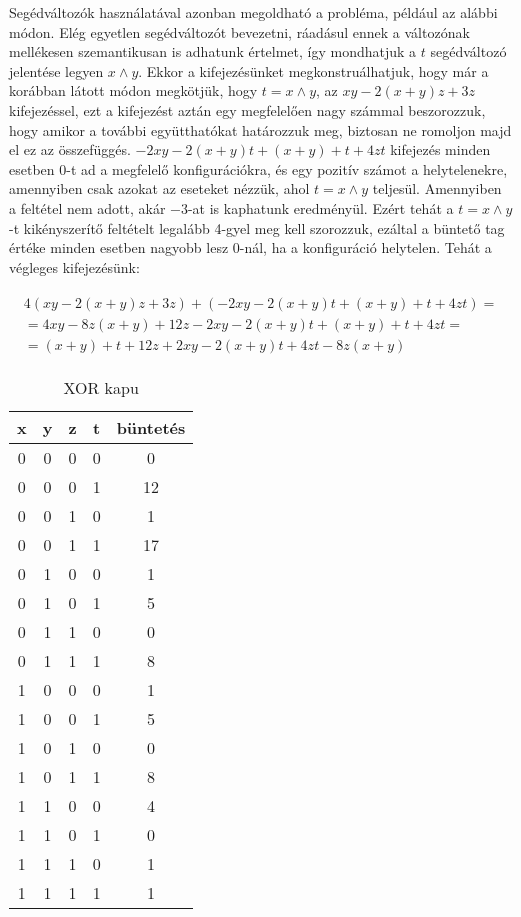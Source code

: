 Segédváltozók használatával azonban megoldható a probléma, például az alábbi módon. Elég egyetlen segédváltozót bevezetni, ráadásul ennek a változónak mellékesen szemantikusan is adhatunk értelmet, így mondhatjuk a $t$ segédváltozó jelentése legyen $x \wedge y$.
Ekkor a kifejezésünket megkonstruálhatjuk, hogy már a korábban látott módon megkötjük, hogy $t = x \wedge y$, az $xy-2(x+y)z+3z$ kifejezéssel, ezt a kifejezést aztán egy megfelelően nagy számmal beszorozzuk, hogy amikor a további együtthatókat határozzuk meg, biztosan ne romoljon majd el ez az összefüggés. $-2xy-2(x+y)t+(x+y)+t+4zt$ kifejezés minden esetben $0$-t ad a megfelelő konfigurációkra, és egy pozitív számot a helytelenekre, amennyiben csak azokat az eseteket nézzük, ahol $t = x \wedge  y$ teljesül. Amennyiben a feltétel nem adott, akár $-3$-at is kaphatunk eredményül. Ezért tehát a $t = x \wedge  y$-t kikényszerítő feltételt legalább 4-gyel meg kell szorozzuk, ezáltal a büntető tag értéke minden esetben nagyobb lesz $0$-nál, ha a konfiguráció helytelen. Tehát a végleges kifejezésünk:



\begin{align}
\begin{split}
	4(xy-2(x+y)z+3z)+(-2xy-2(x+y)t+(x+y)+t+4zt) = \\
    = 4xy-8z(x+y)+12z-2xy-2(x+y)t+(x+y)+t+4zt = \\
	= (x+y)+t+12z+2xy-2(x+y)t+4zt-8z(x+y)	
\end{split}
\end{align}

\begin{table}[ht]
	\footnotesize
	\centering
	\begin{tabular}{ c c c c c }
		\toprule
		x & y & z & t & büntetés \\
		\midrule
		0 & 0 & 0 & 0 & 0 \\
		0 & 0 & 0 & 1 & 12 \\
		0 & 0 & 1 & 0 & 1 \\
		0 & 0 & 1 & 1 & 17 \\
		0 & 1 & 0 & 0 & 1 \\
		0 & 1 & 0 & 1 & 5 \\
		0 & 1 & 1 & 0 & 0 \\
		0 & 1 & 1 & 1 & 8 \\		
		1 & 0 & 0 & 0 & 1 \\
		1 & 0 & 0 & 1 & 5 \\
		1 & 0 & 1 & 0 & 0 \\
		1 & 0 & 1 & 1 & 8 \\
		1 & 1 & 0 & 0 & 4 \\
		1 & 1 & 0 & 1 & 0 \\
		1 & 1 & 1 & 0 & 1 \\
		1 & 1 & 1 & 1 & 1 \\		
		\bottomrule
	\end{tabular}
	\caption{XOR kapu}
	\label{tab:XORgate}
\end{table}

